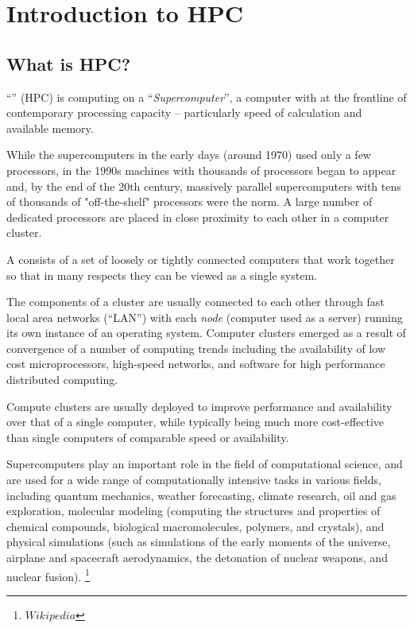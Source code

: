 \chapter{Introduction to HPC}
\label{ch:introduction-to-hpc}

\section{What is HPC?}
\label{sec:what-is-hpc}

``'' (HPC) is computing on a
``\emph{Supercomputer}'', a computer with at the frontline of contemporary
processing capacity -- particularly speed of calculation and available memory.

While the supercomputers in the early days (around 1970) used only a few
processors, in the 1990s machines with thousands of processors began to appear
and, by the end of the 20th century, massively parallel supercomputers with
tens of thousands of "off-the-shelf" processors were the norm. A large number
of dedicated processors are placed in close proximity to each other in a
computer cluster.

A  consists of a set of loosely or tightly connected
computers that work together so that in many respects they can be viewed as a
single system.

The components of a cluster are usually connected to each other through fast
local area networks (``LAN'') with each \emph{node} (computer used as a
server) running its own instance of an operating system. Computer clusters
emerged as a result of convergence of a number of computing trends including
the availability of low cost microprocessors, high-speed networks, and software
for high performance distributed computing.

Compute clusters are usually deployed to improve performance and availability
over that of a single computer, while typically being much more cost-effective
than single computers of comparable speed or availability.

Supercomputers play an important role in the field of computational science,
and are used for a wide range of computationally intensive tasks in various
fields, including quantum mechanics, weather forecasting, climate research, oil
and gas exploration, molecular modeling (computing the structures and
properties of chemical compounds, biological macromolecules, polymers, and
crystals), and physical simulations (such as simulations of the early moments
of the universe, airplane and spacecraft aerodynamics, the detonation of
nuclear weapons, and nuclear fusion). \footnote{ $ Wikipedia$ }

